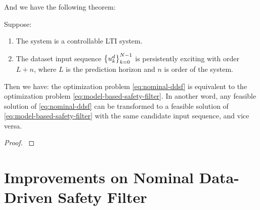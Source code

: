 And we have the following theorem:

\begin{theorem}\label{thm:nominal-equivalence}
    Suppose:
    \begin{enumerate}
        \item The system is a controllable LTI system.
        \item The dataset input sequence $\left\{u^d_k\right\}_{k=0}^{N-1}$ is persistently exciting with order $L+n$, where $L$ is the prediction horizon and $n$ is order of the system.
    \end{enumerate}
    Then we have: the optimization problem \cref{eq:nominal-ddsf} is equivalent to the optimization problem \cref{eq:model-based-safety-filter}.
    In another word, any feasible solution of \cref{eq:nominal-ddsf} can be transformed to a feasible solution of \cref{eq:model-based-safety-filter} with the same candidate input sequence, and vice versa.
\end{theorem}

\begin{proof}\label{prf:nominal-equivalence}
    
\end{proof}

\section{Improvements on Nominal Data-Driven Safety Filter}\label{sec:improvements-nominal}
